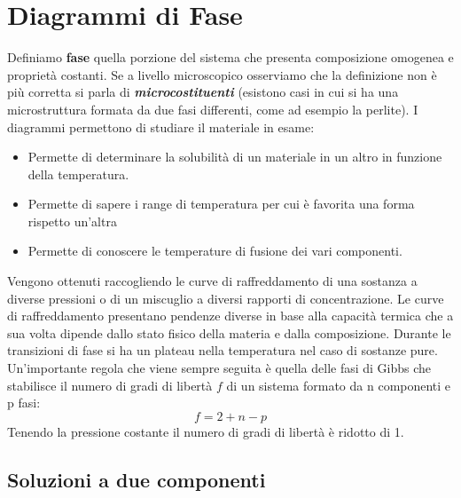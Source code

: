 \newpage

\section{Diagrammi di Fase}

Definiamo \textbf{\textbf{fase}} quella porzione del sistema che presenta composizione omogenea e proprietà costanti. Se a livello microscopico osserviamo che la definizione non è più corretta si parla di \textbf{\textit{microcostituenti}} (esistono casi in cui si ha una microstruttura formata da due fasi differenti, come ad esempio la perlite).
I diagrammi permettono di studiare il materiale in esame:
\begin{itemize}
    \item Permette di determinare la solubilità di un materiale in un altro in funzione della temperatura.
    \item Permette di sapere i range di temperatura per cui è favorita una forma rispetto un'altra
    \item Permette di conoscere le temperature di fusione dei vari componenti.
\end{itemize}
Vengono ottenuti raccogliendo le curve di raffreddamento di una sostanza a diverse pressioni o di un miscuglio a diversi rapporti di concentrazione.
Le curve di raffreddamento presentano pendenze diverse in base alla capacità termica che a sua volta dipende dallo stato fisico della materia e dalla composizione. Durante le transizioni di fase si ha un plateau nella temperatura nel caso di sostanze pure. Un'importante regola che viene sempre seguita è quella delle fasi di Gibbs che stabilisce il numero di gradi di libertà $f$ di un sistema formato da n componenti e p fasi:
\begin{equation}
    f = 2+n-p
\end{equation}
Tenendo la pressione costante il numero di gradi di libertà è ridotto di 1.

\subsection{Soluzioni a due componenti}

